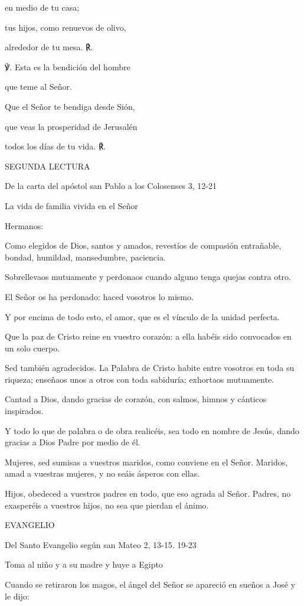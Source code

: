 \documentclass[]{article}
\begin{document}
en medio de tu casa;

tus hijos, como renuevos de olivo,

alrededor de tu mesa. ℟.

℣. Esta es la bendición del hombre

que teme al Señor.

Que el Señor te bendiga desde Sión,

que veas la prosperidad de Jerusalén

todos los días de tu vida. ℟.

SEGUNDA LECTURA

De la carta del apóstol san Pablo a los Colosenses 3, 12-21

La vida de familia vivida en el Señor

Hermanos:

Como elegidos de Dios, santos y amados, revestíos de compasión
entrañable, bondad, humildad, mansedumbre, paciencia.

Sobrellevaos mutuamente y perdonaos cuando alguno tenga quejas contra
otro.

El Señor os ha perdonado: haced vosotros lo mismo.

Y por encima de todo esto, el amor, que es el vínculo de la unidad
perfecta.

Que la paz de Cristo reine en vuestro corazón: a ella habéis sido
convocados en un solo cuerpo.

Sed también agradecidos. La Palabra de Cristo habite entre vosotros en
toda su riqueza; enseñaos unos a otros con toda sabiduría; exhortaos
mutuamente.

Cantad a Dios, dando gracias de corazón, con salmos, himnos y cánticos
inspirados.

Y todo lo que de palabra o de obra realicéis, sea todo en nombre de
Jesús, dando gracias a Dios Padre por medio de él.

Mujeres, sed sumisas a vuestros maridos, como conviene en el Señor.
Maridos, amad a vuestras mujeres, y no seáis ásperos con ellas.

Hijos, obedeced a vuestros padres en todo, que eso agrada al Señor.
Padres, no exasperéis a vuestros hijos, no sea que pierdan el ánimo.

EVANGELIO

Del Santo Evangelio según san Mateo 2, 13-15. 19-23

Toma al niño y a su madre y huye a Egipto

Cuando se retiraron los magos, el ángel del Señor se apareció en sueños
a José y le dijo:
\end{document}
